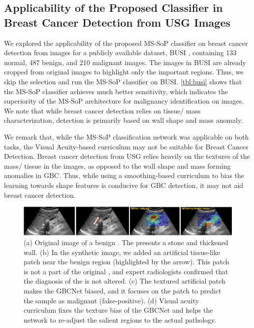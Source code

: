 \subsection{Applicability of the Proposed Classifier in Breast Cancer Detection from USG Images}
%
We explored the applicability of the proposed MS-SoP classifier on breast cancer detection from \usg images for a publicly available dataset, BUSI \cite{al2020dataset}, containing 133 normal, 487 benign, and 210 malignant images. The images in BUSI are already cropped from original \usg images to highlight only the important regions. Thus, we skip the \roi selection and run the MS-SoP classifier on BUSI. \cref{tbl:busi} shows that the MS-SoP classifier achieves much better sensitivity, which indicates the superiority of the MS-SoP architecture for malignancy identification on \usg images. We note that while breast cancer detection relies on tissue/ mass characterization, \gbc detection is primarily based on wall shape and mass anomaly. %
\par We remark that, while the MS-SoP classification network was applicable on both tasks, the Visual Acuity-based curriculum may not be suitable for Breast Cancer Detection. Breast cancer detection from USG relies heavily on the textures of the mass/ tissue in the images, as opposed to the wall shape and mass forming anomalies in GBC. Thus, while using a smoothing-based curriculum to bias the learning towards shape features is conducive for GBC detection, it may not aid breast cancer detection.

\begin{figure}[t]
	\centering
	\includegraphics[width=0.9\linewidth]{figs/gbcnet/texture_vis_curr.png}
	\caption[Visualization of the effect of curriculum]{(a) Original image of a benign \gb. The \gb presents a stone and thickened wall. (b) In the synthetic image, we added an artificial tissue-like patch near the benign \gb region (highlighted by the arrow). This patch is not a part of the original \gb, and expert radiologists confirmed that the diagnosis of the \gb is not altered. (c) The textured artificial patch makes the GBCNet biased, and it focuses on the patch to predict the sample as malignant (false-positive). (d) Visual acuity curriculum fixes the texture bias of the GBCNet and helps the network to re-adjust the salient regions to the actual \gb pathology. %
}
	\label{fig:texture_vis}
\end{figure}

